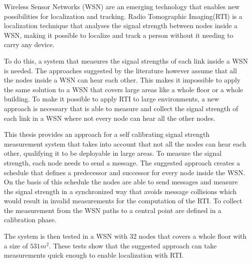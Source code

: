 Wireless Sensor Networks (WSN) are an emerging technology that enables new possibilities for localization and tracking. Radio Tomographic Imaging(RTI) is a localization technique that analyses the signal strength between nodes inside a WSN, making it possible to localize and track a person without it needing to carry any device.

To do this, a system that measures the signal strengths of each link inside a WSN is needed. The approaches suggested by the literature however assume that all the nodes inside a WSN can hear each other. This makes it impossible to apply the same solution to a WSN that covers large areas like a whole floor or a whole building. To make it possible to apply RTI to large environments, a new approach is necessary that is able to measure and collect the signal strength of each link in a WSN where not every node can hear all the other nodes. 

This thesis provides an approach for a self calibrating signal strength measurement system that takes into account that not all the nodes can hear each other, qualifying it to be deployable in large areas. To measure the signal strength, each node needs to send a message. The suggested approach creates a schedule that defines a predecessor and successor for every node inside the WSN. On the basis of this schedule the nodes are able to send messages and measure the signal strength in a synchronized way that avoids message collisions which would result in invalid measurements for the computation of the RTI. To collect the measurement from the WSN paths to a central point are defined in a calibration phase. 

The system is then tested in a WSN with 32 nodes that covers a whole floor with a size of $531 m^2$. These tests show that the suggested approach can take measurements quick enough to enable localization with RTI.
\cleardoublepage
